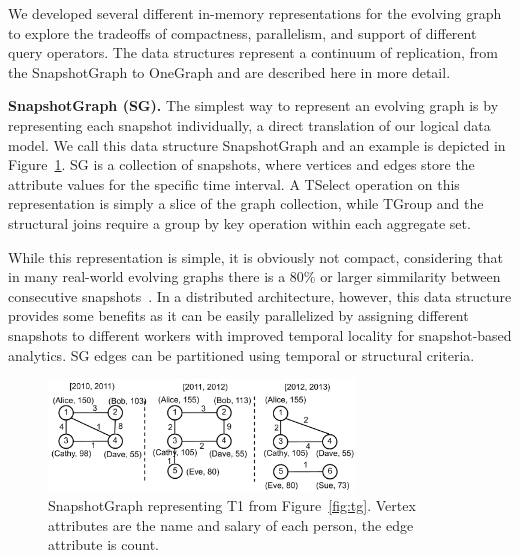 We developed several different in-memory representations for the
evolving graph to explore the tradeoffs of compactness, parallelism,
and support of different query operators.  The data structures
represent a continuum of replication, from the SnapshotGraph to
OneGraph and are described here in more detail.

{\bf SnapshotGraph (SG).} The simplest way to represent an evolving
graph is by representing each snapshot individually, a direct
translation of our logical data model.  We call this data structure
SnapshotGraph and an example is depicted in Figure~\ref{fig:sgp}.
SG is a collection of snapshots, where vertices and
edges store the attribute values for the specific time interval.  A
TSelect operation on this representation is simply a slice of the
graph collection, while TGroup and the structural joins require a
group by key operation within each aggregate set.

While this representation is simple, it is obviously not compact,
considering that in many real-world evolving graphs there is a 80\% or
larger simmilarity between consecutive
snapshots~\cite{DBLP:journals/tos/MiaoHLWYZPCC15}.  In a distributed
architecture, however, this data structure provides some
benefits as it can be easily parallelized by assigning different
snapshots to different workers with improved temporal locality for
snapshot-based analytics.  SG edges can be partitioned
using temporal or structural criteria.  

\begin{figure}[t!]
\includegraphics[width=3.2in]{figs/sgp.pdf}
\caption{SnapshotGraph representing T1 from
  Figure~\ref{fig:tg}.  Vertex attributes are the name and salary of
  each person, the edge attribute is count.}
\label{fig:sgp}
\end{figure}

